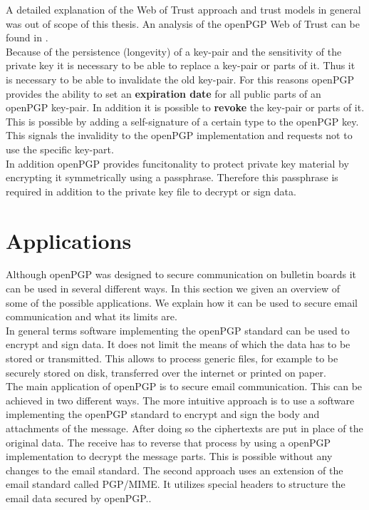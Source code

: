 A detailed explanation of the Web of Trust approach and trust models in general was out of scope of this thesis. An analysis of the openPGP Web of Trust can be found in . \\


Because of the persistence (longevity) of a key-pair and the sensitivity of the private key it is necessary to be able to replace a key-pair or parts of it. Thus it is necessary to be able to invalidate the old key-pair. For this reasons openPGP provides the ability to set an \textbf{expiration date} for all public parts of an openPGP key-pair. In addition it is possible to \textbf{revoke} the key-pair or parts of it. This is possible by adding a self-signature of a certain type to the openPGP key. This signals the invalidity to the openPGP implementation and requests not to use the specific key-part. \\

In addition openPGP provides funcitonality to protect private key material by encrypting it symmetrically using a passphrase. Therefore this passphrase is required in addition to the private key file to decrypt or sign data.

\section{Applications} \label{section:openpgp:applications}

Although openPGP was designed to secure communication on bulletin boards it can be used in several different ways. In this section we given an overview of some of the possible applications. We explain how it can be used to secure email communication and what its limits are.  \\


In general terms software implementing the openPGP standard can be used to encrypt and sign data. It does not limit the means of which the data has to be stored or transmitted. This allows to process generic files, for example to be securely stored on disk, transferred over the internet or printed on paper. \\  


The main application of openPGP is to secure email communication. This can be achieved in two different ways. The more intuitive approach is to use a software implementing the openPGP standard to encrypt and sign the body and attachments of the message. After doing so the ciphertexts are put in place of the original data. The receive has to reverse that process by using a openPGP implementation to decrypt the message parts. This is possible without any changes to the email standard. The second approach uses an extension of the email standard called PGP/MIME. It utilizes special headers to structure the email data secured by openPGP..

